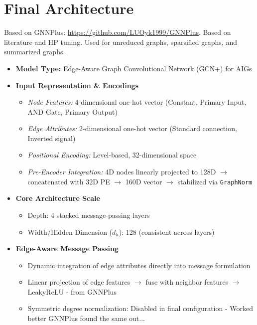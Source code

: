 \documentclass[paper=a4, fontsize=11pt]{scrartcl} %
\numberwithin{equation}{section} %
\numberwithin{figure}{section} %
\numberwithin{table}{section} %
\begin{document}



\section{Final Architecture}
Based on GNNPlus: \url{https://github.com/LUOyk1999/GNNPlus}.
Based on literature and HP tuning. Used for unreduced graphs, sparsified graphs, and summarized graphs. 

\begin{itemize}
    \item \textbf{Model Type:} Edge-Aware Graph Convolutional Network (GCN+) for AIGs
    \item \textbf{Input Representation \& Encodings}
    \begin{itemize}
        \item \textit{Node Features:} 4-dimensional one-hot vector (Constant, Primary Input, AND Gate, Primary Output)
        \item \textit{Edge Attributes:} 2-dimensional one-hot vector (Standard connection, Inverted signal)
        \item \textit{Positional Encoding:} Level-based, 32-dimensional space
        \item \textit{Pre-Encoder Integration:} 4D nodes linearly projected to 128D $\rightarrow$ concatenated with 32D PE $\rightarrow$ 160D vector $\rightarrow$ stabilized via \texttt{GraphNorm}
    \end{itemize}

    \item \textbf{Core Architecture Scale}
    \begin{itemize}
        \item Depth: 4 stacked message-passing layers
        \item Width/Hidden Dimension ($d_h$): 128 (consistent across layers)
    \end{itemize}

    \item \textbf{Edge-Aware Message Passing}
    \begin{itemize}
        \item Dynamic integration of edge attributes directly into message formulation
        \item Linear projection of edge features $\rightarrow$ fuse with neighbor features $\rightarrow$ LeakyReLU - from GNNPlus
        \item Symmetric degree normalization: Disabled in final configuration - Worked better GNNPlus found the same out...
    \end{itemize}


\end{itemize}
\end{document}
